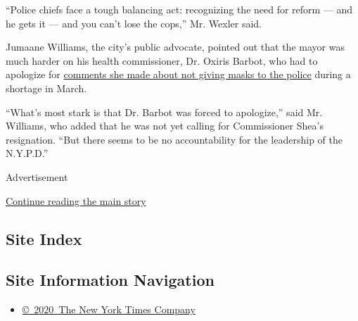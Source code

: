 ``Police chiefs face a tough balancing act: recognizing the need for
reform --- and he gets it --- and you can't lose the cops,'' Mr. Wexler
said.

Jumaane Williams, the city's public advocate, pointed out that the mayor
was much harder on his health commissioner, Dr. Oxiris Barbot, who had
to apologize for
\href{https://www.nytimes3xbfgragh.onion/2020/05/19/nyregion/barbot-police-health-coronavirus.html}{comments
she made about not giving masks to the police} during a shortage in
March.

``What's most stark is that Dr. Barbot was forced to apologize,'' said
Mr. Williams, who added that he was not yet calling for Commissioner
Shea's resignation. ``But there seems to be no accountability for the
leadership of the N.Y.P.D.''

Advertisement

\protect\hyperlink{after-bottom}{Continue reading the main story}

\hypertarget{site-index}{%
\subsection{Site Index}\label{site-index}}

\hypertarget{site-information-navigation}{%
\subsection{Site Information
Navigation}\label{site-information-navigation}}

\begin{itemize}
\tightlist
\item
  \href{https://help.nytimes3xbfgragh.onion/hc/en-us/articles/115014792127-Copyright-notice}{©~2020~The
  New York Times Company}
\end{itemize}

